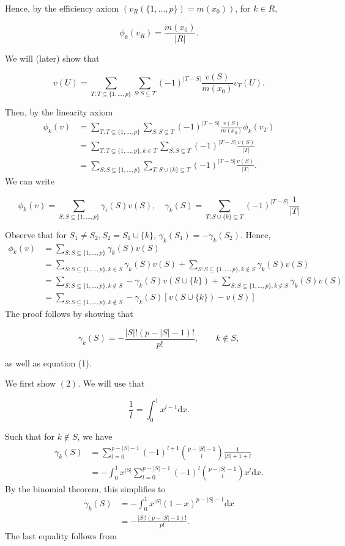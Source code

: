 \documentclass[
]{book}
\begin{document}
Hence, by the efficiency axiom \((v_R(\{1,\dots,p\})=m(x_0))\), for \(k\in R\),

\[
\phi_k(v_R)= \frac{m(x_0)}{|R|}.
\]

We will (later) show that

\[
\tag{1}
v(U)=\sum_{T: T\subseteq\{1,\dots,p\}}\sum_{S: S\subseteq T} (-1)^{|T-S|}\frac{v(S)}{m(x_0)}v_T(U).
\]

Then, by the linearity axiom
\begin{align}
\phi_k(v)&=\sum_{T: T\subseteq\{1,\dots,p\}}\sum_{S: S\subseteq T} (-1)^{|T-S|} \frac{v(S)}{m(x_0)} \phi_k(v_T)\\
&=\sum_{T: T\subseteq\{1,\dots,p\}, k \in T}\sum_{S: S\subseteq T} (-1)^{|T-S|} \frac{v(S)}{|T|}\\
&=\sum_{S: S\subseteq\{1,\dots,p\}}\sum_{T: S \cup \{k\} \subseteq T} (-1)^{|T-S|} \frac{v(S)}{|T|} .
\end{align}
We can write

\[
\phi_k(v)=\sum_{S: S\subseteq\{1,\dots,p\}}\gamma_i(S) v(S)  , \quad  \gamma_k(S)=\sum_{T: S\cup \{k\}\subseteq T} (-1)^{|T-S|} \frac{1}{|T|}
\]

Observe that for \(S_1\neq S_2, S_2=S_1\cup\{k\}\), \(\gamma_k(S_1)=-\gamma_k(S_2)\). Hence,
\begin{align}
\phi_k(v)&=\sum_{S: S\subseteq\{1,\dots,p\}}\gamma_k(S) v(S) \\
&= \sum_{S: S\subseteq\{1,\dots,p\}, k\in S}\gamma_k(S) v(S) +\sum_{S: S\subseteq\{1,\dots,p\}, k\notin S}\gamma_k(S) v(S) \\
&= \sum_{S: S\subseteq\{1,\dots,p\}, k\notin S}-\gamma_k(S) v(S\cup\{k\}) +\sum_{S: S\subseteq\{1,\dots,p\}, k\notin S}\gamma_k(S) v(S) \\
&= \sum_{S: S\subseteq\{1,\dots,p\}, k\notin S}-\gamma_k(S) \left [ v(S\cup\{k\})  - v(S) \right]
\end{align}
The proof follows by showing that

\[ 
\tag{2}
\gamma_k(S)=-\frac{|S|!(p-|S|-1)!}{p!}, \qquad k \notin S,
\]

as well as equation (1).

We first show \((2)\). We will use that

\[
\frac 1 l = \int_0^1 x^{l-1}\mathrm dx.
\]

Such that for \(k \notin S\), we have
\begin{align}
\gamma_k(S)&= \sum_{l=0}^{p-|S|-1} (-1)^{l+1}\binom{p-|S|-1}{l}\frac 1 {|S|+1+l} \\
&= -\int_0^1x^{|S|}\sum_{l=0}^{p-|S|-1} (-1)^{l}\binom{p-|S|-1}{l}x^{l}\mathrm dx.
\end{align}
By the binomial theorem, this simplifies to
\begin{align}
\gamma_k(S)&=  - \int_0^1x^{|S|}(1-x)^{p-|S|-1}\mathrm dx \\
&= -\frac{|S|!(p-|S|-1)!}{p!}.
\end{align}
The last equality follows from
\end{document}
